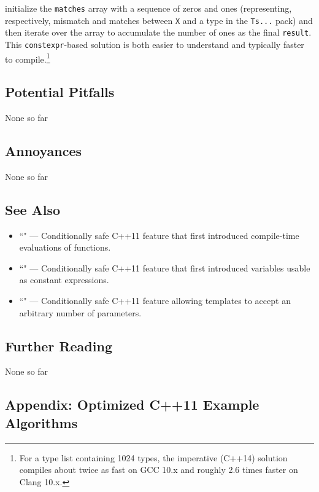 initialize the \texttt{matches} array with a sequence of zeros and ones
(representing, respectively, mismatch and matches between \texttt{X} and
a type in the \texttt{Ts...} pack) and then iterate over the array to
accumulate the number of ones as the final \texttt{result}. This
\texttt{constexpr}-based solution is both easier to understand and
typically faster to compile.{\cprotect\footnote{For a type list
containing 1024 types, the imperative (C++14) solution compiles about
twice as fast on GCC 10.x and roughly 2.6 times faster on Clang
10.x.}}

\subsection[Potential Pitfalls]{Potential Pitfalls}\label{potential-pitfalls}

None so far

\subsection[Annoyances]{Annoyances}\label{annoyances}

None so far

\subsection[See Also]{See Also}\label{see-also}

\begin{itemize}
\item{``" — Conditionally safe C++11 feature that first introduced compile-time evaluations of functions.}
\item{``" — Conditionally safe C++11 feature that first introduced variables usable as constant expressions.}
\item{``" — Conditionally safe C++11 feature allowing templates to accept an arbitrary number of parameters.}
\end{itemize}

\subsection[Further Reading]{Further Reading}\label{further-reading}

None so far

\subsection[Appendix: Optimized C++11 Example Algorithms]{Appendix: Optimized C++11 Example Algorithms}\label{appendix:-optimized-c++11-example-algorithms}

